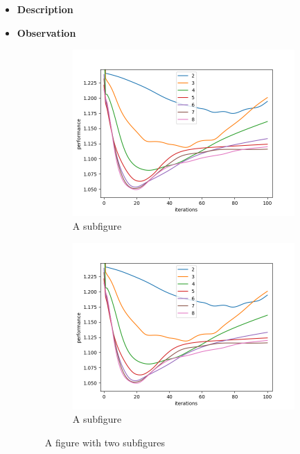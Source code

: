 \documentclass[thesis=M,english]{FITthesis}[2012/10/20]
\begin{document}
\begin{itemize}
\item \textbf{ Description }
\item \textbf{ Observation }

\begin{figure}
\centering
\begin{subfigure}{.8\textwidth}
  \centering
  \includegraphics[width=1\linewidth]{img/ex5/test_small.png}
  \caption{A subfigure}
  \label{fig:sub1}
\end{subfigure}
\begin{subfigure}{.8\textwidth}
  \centering
  \includegraphics[width=1\linewidth]{img/ex5/test_small.png}
  \caption{A subfigure}
  \label{fig:sub2}
\end{subfigure}
\caption{A figure with two subfigures}
\label{fig:test}
\end{figure}


\end{itemize}
\end{document}

